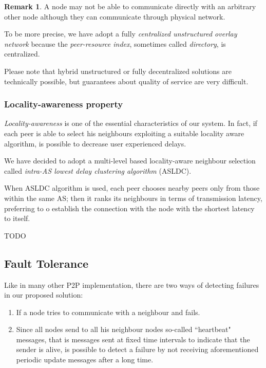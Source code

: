 \documentclass[10pt,a4paper]{article}
\theoremstyle{definition}
\newtheorem*{remark}{Remark}
\begin{document}
\begin{remark}
A node may not be able to communicate directly with an arbitrary other node although they can communicate through physical network.
\end{remark}

To be more precise, we have adopt a fully \textit{centralized unstructured overlay network} because the \textit{peer-resource index}, sometimes called \textit{directory}, is centralized. 

Please note that hybrid unstructured or fully decentralized solutions are technically possible, but guarantees about quality of service are very difficult.

\subsubsection{Locality-awareness property}

\textit{Locality-awareness} is one of the essential characteristics of our system. In fact, if each peer is able to select his neighbours exploiting a suitable locality aware algorithm, is possible to decrease user experienced delays.

We have decided to adopt a multi-level based locality-aware neighbour selection called \textit{intra-AS lowest delay clustering algorithm} (ASLDC). 

When ASLDC algorithm is used, each peer chooses nearby peers only from those within the same AS; then it ranks its neighbours in terms of transmission latency, preferring to o establish the connection with the node with the shortest latency to itself. 

TODO \cite{UnderstandingLocalityAwareness}

\subsection{Fault Tolerance}

Like in many other P2P implementation, there are two ways of detecting failures in our proposed solution:

\begin{enumerate}
\item If a node tries to communicate with a neighbour and fails.
\item Since all nodes send to all his neighbour nodes so-called ``heartbeat" messages, that is messages sent at fixed time intervals to indicate that the sender is alive, is possible to detect a failure by not receiving aforementioned periodic update messages after a long time. 

\end{enumerate}
\end{document}
